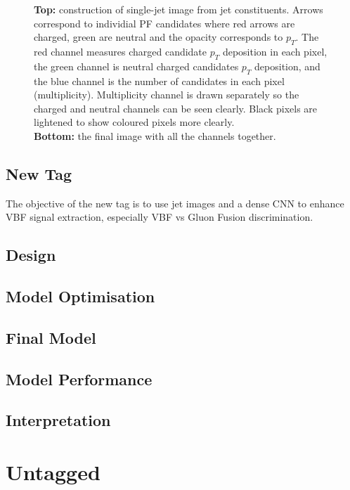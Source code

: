 \begin{figure}[h!]
    \caption{\textbf{Top:} 
             construction of single-jet image from jet constituents. Arrows correspond to individial PF candidates where red arrows are charged, green are neutral and the opacity corresponds to $p_{T}$.
             The red channel measures charged candidate $p_T$ deposition in each pixel, 
             the green channel is neutral charged candidates $p_T$ deposition, 
             and the blue channel is the number of candidates in each pixel (multiplicity). 
             Multiplicity channel is drawn separately so the charged and neutral channels can be seen clearly. Black pixels are lightened to show coloured pixels more clearly.\\
             \textbf{Bottom:} 
             the final image with all the channels together.}
    \label{fig:event_categorisation:jet_image}

\end{figure}


\subsection{New Tag}
The objective of the new tag is to use jet images and a dense CNN to enhance VBF signal extraction, especially VBF vs Gluon Fusion discrimination. 

\subsection{Design}
\subsection{Model Optimisation}
\subsection{Final Model}
\subsection{Model Performance}
\subsection{Interpretation}

\section{Untagged}
